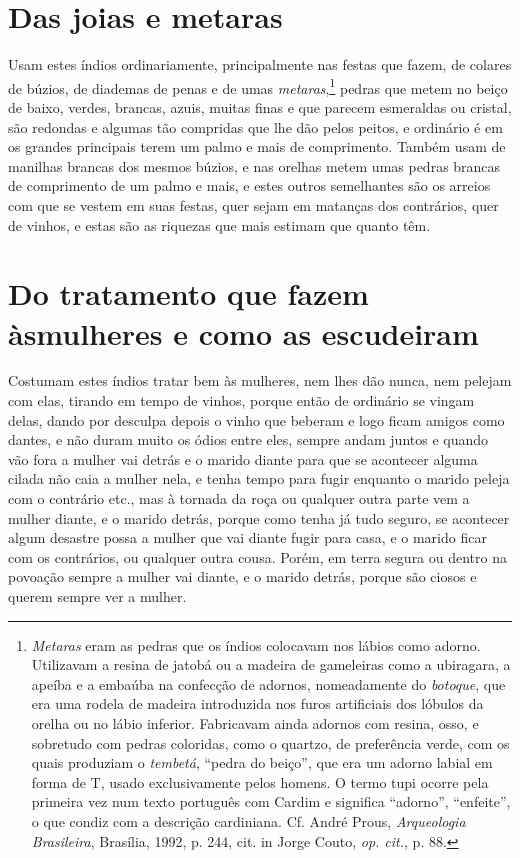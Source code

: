 \section{Das joias e metaras} 
Usam estes índios ordinariamente, principalmente nas festas
que fazem, de colares de búzios, de diademas de penas e de umas
\textit{metaras},\footnote{ \textit{Metaras} eram as pedras que os
índios colocavam nos lábios como adorno. Utilizavam a resina de
jatobá ou a madeira de gameleiras como a ubiragara, a apeíba e a
embaúba na confecção de adornos, nomeadamente do \textit{botoque}, que
era uma rodela de madeira introduzida nos furos artificiais dos lóbulos
da orelha ou no lábio inferior. Fabricavam ainda adornos com resina,
osso, e sobretudo com pedras coloridas, como o quartzo, de preferência
verde, com os quais produziam o \textit{tembetá}, ``pedra do beiço'', que
era um adorno labial em forma de T, usado exclusivamente pelos
homens. O termo tupi ocorre pela primeira vez num texto
português com Cardim e significa ``adorno'', ``enfeite'', o que condiz com
a descrição cardiniana. Cf. André Prous, \textit{Arqueologia
Brasileira}, Brasília, 1992, p. 244, cit. in Jorge Couto, \textit{op. cit.}, 
p. 88.} pedras que metem no beiço de baixo, verdes, brancas,
azuis, muitas finas e que parecem esmeraldas ou cristal, são redondas e
algumas tão compridas que lhe dão pelos peitos, e ordinário é em os
grandes principais terem um palmo e mais de comprimento. Também usam de
manilhas brancas dos mesmos búzios, e nas orelhas metem umas pedras
brancas de comprimento de um palmo e mais, e estes outros semelhantes
são os arreios com que se vestem em suas festas, quer sejam em matanças
dos contrários, quer de vinhos, e estas são as riquezas que mais
estimam que quanto têm.

\section[Do tratamento que fazem às mulheres]{Do tratamento que fazem às\break mulheres e como as escudeiram} 
Costumam estes índios tratar bem às mulheres, nem lhes dão
nunca, nem pelejam com elas, tirando em tempo de vinhos, porque então
de ordinário se vingam delas, dando por desculpa depois o vinho que
beberam e logo ficam amigos como dantes, e não duram muito os ódios
entre eles, sempre andam juntos e quando vão fora a mulher vai detrás
e o marido diante para que se acontecer alguma cilada não caia a mulher
nela, e tenha tempo para fugir enquanto o marido peleja com o
contrário etc., mas à tornada da roça ou qualquer outra parte vem a
mulher diante, e o marido detrás, porque como tenha já tudo seguro, se
acontecer algum desastre possa a mulher que vai diante fugir para casa,
e o marido ficar com os contrários, ou qualquer outra cousa. Porém, em
terra segura ou dentro na povoação sempre a mulher vai diante, e o
marido detrás, porque são ciosos e querem sempre ver a mulher.

